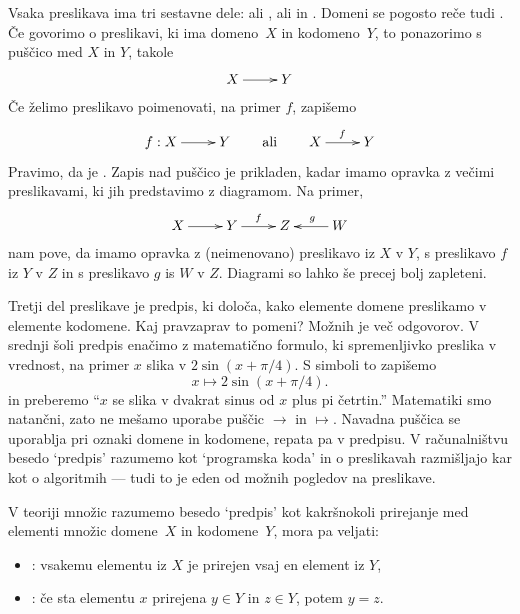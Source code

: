 Vsaka preslikava ima tri sestavne dele:  ali ,
 ali  in . Domeni se pogosto reče tudi
. Če govorimo o preslikavi, ki ima domeno~$X$ in kodomeno~$Y$, to
ponazorimo s puščico med $X$ in $Y$, takole
%
\begin{equation*}
  \xymatrix{
    {X} \ar[r] &
    {Y}
  }
\end{equation*}
%
Če želimo preslikavo poimenovati, na primer $f$, zapišemo
%
\begin{equation*}
  \xymatrix{
   {f : X} \ar[r] &
    {Y}
  }
  \qquad\text{ali}\qquad
  \xymatrix{
   {X} \ar[r]^{f} &
   {Y}
  }
\end{equation*}
%
Pravimo, da je . Zapis nad puščico je prikladen, kadar
imamo opravka z večimi preslikavami, ki jih predstavimo z diagramom. Na primer,
%
\begin{equation*}
  \xymatrix{
    {X} \ar[r] &
    {Y} \ar[r]^{f} &
    {Z}  &
    {W} \ar[l]_{g}
  }
\end{equation*}
%
nam pove, da imamo opravka z (neimenovano) preslikavo iz $X$ v $Y$, s preslikavo $f$ iz
$Y$ v $Z$ in s preslikavo $g$ is $W$ v $Z$. Diagrami so lahko še precej bolj zapleteni.

Tretji del preslikave je predpis, ki določa, kako elemente domene preslikamo v elemente
kodomene. Kaj pravzaprav to pomeni? Možnih je več odgovorov. V srednji šoli predpis
enačimo z matematično formulo, ki spremenljivko preslika v vrednost, na primer $x$ slika v
$2 \sin(x + \pi/4)$. S simboli to zapišemo
%
\begin{equation*}
  x \mapsto 2 \sin(x + \pi/4).
\end{equation*}
%
in preberemo ``$x$ se slika v dvakrat sinus od $x$ plus pi četrtin.''
%
Matematiki smo natančni, zato ne mešamo uporabe puščic $\to$ in $\mapsto$. Navadna puščica
se uporablja pri oznaki domene in kodomene, repata pa v predpisu. V računalništvu besedo
`predpis' razumemo kot `programska koda' in o preslikavah razmišljajo kar kot o
algoritmih --- tudi to je eden od možnih pogledov na preslikave.

V teoriji množic razumemo besedo `predpis' kot kakršnokoli prirejanje med elementi množic
domene~$X$ in kodomene~$Y$, mora pa veljati:
%
\begin{itemize}
\item {}: vsakemu elementu iz $X$ je prirejen vsaj en element iz $Y$,
\item {}: če sta elementu $x$ prirejena $y \in Y$ in $z \in Y$, potem $y = z$.
\end{itemize}


